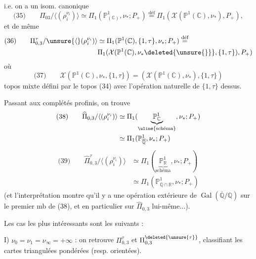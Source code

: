 
i.e. on a un isom. canonique
\[
\text{(35)}\qquad
\Pi_{03}/\langle(\rho_i^{\nu_i})\rangle
\simeq\Pi_1(\mathbb P^1_{(\mathbb C)},\nu_*;P_+)
\overset{\text{déf}}{=}\Pi_1(\mathcal X(\mathbb P^1(\mathbb C),\nu_*),P_+),
\]
et de même
\[
\begin{aligned}
\text{(36)}\qquad
\Pi_{0,3}^{\tau}/\unsure{\langle}(\rho_i^{\nu_i})\rangle
&\simeq\Pi_1(\mathbb P^1(\mathbb C),\{1,\tau\},\nu_*;P_+)\overset{\text{déf}}{=}\\
&\Pi_1(\mathcal X(\mathbb P^1(\mathbb C),\nu_*\deleted{\unsure{\}}},\{1,\tau\}),P_+)
\end{aligned}
\]
où
\[
\text{(37)}\qquad
\mathcal X(\mathbb P^1(\mathbb C),\nu_*,\{1,\tau\})
=(\mathcal X(\mathbb P^1(\mathbb C),\nu_*),\{1,\tau\})
\]
topos mixte défini par le topos (34) avec l'opération naturelle de $\{1,\tau\}$ dessus.


Passant aux complétés profinis, on trouve
\[
\begin{aligned}
\text{(38)}\qquad
\widehat\Pi_{0,3}/\langle(\rho_i^{\nu_i})\rangle
&\simeq\Pi_1(\underbrace{\mathbb P^1_{\mathbb C}}_{\uline{\text{schéma}}},\nu_*;P_+)\\
&\simeq\Pi_1(\mathbb P^1_{\overline{\mathbb Q}},\nu_*;P_+)
\end{aligned}
\]
\[
\begin{aligned}
\text{(39)}\qquad
\widehat\Pi_{0,3}^{\tau}/\langle(\rho_i^{\nu_i})\rangle
&\simeq\Pi_1(\underbrace{\mathbb P^1_{\mathbb R}}_{\text{schéma}},\nu_*;P_+)\\
&\simeq\Pi_1(\mathbb P^1_{\overline{\mathbb Q}\cap\mathbb R},\nu_*;P_+)
\end{aligned}
\]
(et  l'interprétation  montre qu'il y a une
opération extérieure de $\operatorname{Gal}(\overline{\mathbb Q}/\mathbb Q)$ sur le premier mb de (38), et en particulier sur $\widehat\Pi_{0,3}$ lui-même...).

Les cas les plus intéressants sont les  suivants :

I) $\nu_0=\nu_1=\nu_\infty=+\infty$ : on retrouve $\Pi_{0,3}^{\tau}$ et $\Pi_{0,3}^{\deleted{\unsure{\tau}}}$, classifiant les cartes triangulées pondérées (resp. orientées).

